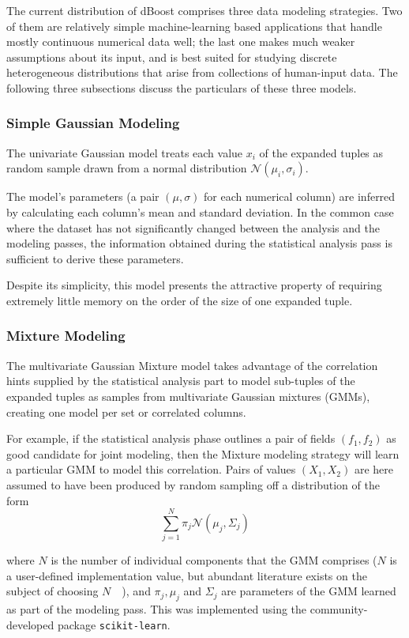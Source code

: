 The current distribution of dBoost comprises three data modeling strategies. Two of them are relatively simple machine-learning based applications that handle mostly continuous numerical data well; the last one makes much weaker assumptions about its input, and is best suited for studying discrete heterogeneous distributions that arise from collections of human-input data. The following three subsections discuss the particulars of these three models.

\subsubsection{Simple Gaussian Modeling}
\label{sec:gaus_model}
The univariate Gaussian model treats each value $x_i$ of the expanded tuples as random sample drawn from a normal distribution $\mathcal N(\mu_i, \sigma_i)$.

The model's parameters (a pair $(\mu, \sigma)$ for each numerical column) are inferred by calculating each column's mean and standard deviation. In the common case where the dataset has not significantly changed between the analysis and the modeling passes, the information obtained during the statistical analysis pass is sufficient to derive these parameters.

Despite its simplicity, this model presents the attractive property of requiring extremely little memory on the order of the size of one expanded tuple.

\subsubsection{Mixture Modeling}
The multivariate Gaussian Mixture model takes advantage of the correlation hints supplied by the statistical analysis part to model sub-tuples of the expanded tuples as samples from multivariate Gaussian mixtures (GMMs), creating one model per set or correlated columns.

For example, if the statistical analysis phase outlines a pair of fields $(f_1, f_2)$ as good candidate for joint modeling, then the Mixture modeling strategy will learn a particular GMM to model this correlation. Pairs of values $(X_1, X_2)$ are here assumed to have been produced by random sampling off a distribution of the form
\begin{equation}
\sum_{j=1}^{N} \pi_j \mathcal N(\mu_j, \Sigma_j)
\end{equation}

where $N$ is the number of individual components that the GMM comprises ($N$ is a user-defined implementation value, but abundant literature exists on the subject of choosing $N$~\cite{Schwartz1978}~\cite{Akaike1974}), and $\pi_j, \mu_j$ and $\Sigma_j$ are parameters of the GMM learned as part of the modeling pass. This was implemented using the community-developed package \texttt{scikit-learn}. 

